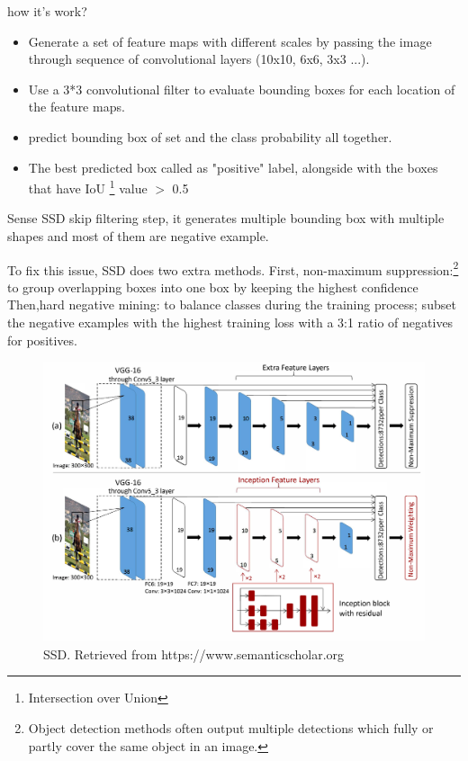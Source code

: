 \documentclass[12pt]{report}
\begin{document}
                    how it's work?
                    \begin{itemize}
                        \item Generate a set of feature maps with different scales 
                        by passing the image through sequence of convolutional layers (10x10, 6x6, 3x3 ...).
                        \item Use a 3*3 convolutional filter to evaluate bounding boxes for each location of the feature maps.
                        \item predict bounding box of set and the class probability all together.
                        \item The best predicted box called as "positive" label, alongside with
                        the boxes that have IoU \footnote{Intersection over Union } value $>$ 0.5 
                    \end{itemize}
                    Sense SSD skip filtering step, it generates multiple bounding box with multiple shapes
                    and most of them are negative example.

                    To fix this issue, SSD does two extra methods.
                    First, non-maximum suppression:\footnote{Object detection methods often output multiple detections which fully or partly cover the same object in an image.}
                    to group overlapping boxes into one box by keeping the highest confidence
                    Then,hard negative mining: to balance classes during the training process; subset the negative examples 
                    with the highest training loss with a 3:1 ratio of negatives for positives.\cite{Liu2016}

                    \begin{figure}[h]
                    \centering
                    \includegraphics[width=.7\textwidth]{./images/ssd.png}
                    \caption{SSD. Retrieved from https://www.semanticscholar.org}
                    \label{fig:frcnn}
                    \end{figure} 
\end{document}
